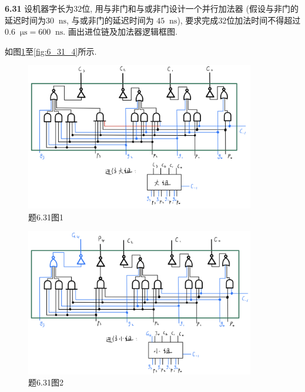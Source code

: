 \documentclass[UTF8]{report}
\newcommand*{\unit}[1]{\mathop{}\!\mathrm{#1}}
\newcommand{\problem}[1]{{\setlength{\parskip}{10pt}\noindent \bf{#1}}}
\newenvironment{solution}{{\noindent\hskip 2em \bf 解 \quad}}{}
\begin{document}
\newpage

\vspace*{0cm}

\newpage

\vspace*{0cm}

\newpage

\vspace*{0cm}

\newpage


\problem{6.31} 设机器字长为$32$位, 用与非门和与或非门设计一个并行加法器 (假设与非门的延迟时间为$30 \unit{ns}$, 与或非门的延迟时间为 $45\unit{ns}$), 要求完成$32$位加法时间不得超过$0.6\unit{\mu s} = 600 \unit{ns}$. 画出进位链及加法器逻辑框图.

\begin{solution}
    如图\ref{fig:6_31_1}至\ref{fig:6_31_4}所示.
    \begin{figure}[!htbp]
        \centering
            \includegraphics[width=10cm]{fig/6.31_大组.png}
        \caption{题6.31图1}
        \label{fig:6_31_1}
    \end{figure}
    \begin{figure}[!htbp]
        \centering
        \includegraphics[width=10cm]{fig/6.31_小组.png}
        \caption{题6.31图2}
        \label{fig:6_31_2}
    \end{figure}

\end{solution}
\end{document}
